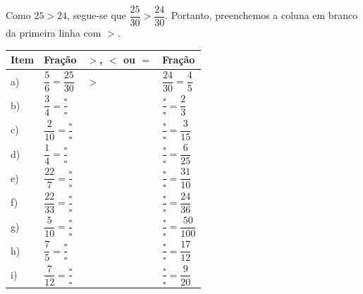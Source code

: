 \documentclass[10 pt,usenames,dvipsnames, oneside]{article}
\begin{document}
Como $25 > 24$, segue-se que $\dfrac{25}{30} > \dfrac{24}{30}$. Portanto, preenchemos a coluna em branco da primeira linha com $>$.


\begin{center}
\begin{longtable}{|	m{}|m{}|m{}|m{}|}
\hline
Item &  Fração &  $>$, $<$ ou $=$ &  Fração \\
\hline \hline
a) & \parbox[b][1.2cm][c]{3cm}{ $\dfrac{5}{6} = \dfrac{25}{30}$ } &   $>$&  $\dfrac{24}{30} = \dfrac{4}{5}$ \\
\hline
b) & \parbox[b][1.2cm][c]{3cm}{ $\dfrac{3}{4} = \dfrac{\square}{\square}$} &   &  $\dfrac{\square}{\square} = \dfrac{2}{3}$ \\
\hline
c) &  \parbox[b][1.2cm][c]{3cm}{$\dfrac{2}{10} = \dfrac{\square}{\square}$} &   &  $\dfrac{\square}{\square} = \dfrac{3}{15}$ \\
\hline
d) & \parbox[b][1.2cm][c]{3cm}{ $\dfrac{1}{4} = \dfrac{\square}{\square}$} &   &  $\dfrac{\square}{\square} = \dfrac{6}{25}$ \\
\hline
e) & \parbox[b][1.2cm][c]{3cm}{ $\dfrac{22}{7} = \dfrac{\square}{\square}$} &  &  $\dfrac{\square}{\square} = \dfrac{31}{10}$ \\
\hline
f) & \parbox[b][1.2cm][c]{3cm}{ $\dfrac{22}{33} = \dfrac{\square}{\square}$} &   &  $\dfrac{\square}{\square} = \dfrac{24}{36}$ \\
\hline
g) & \parbox[b][1.2cm][c]{3cm}{ $\dfrac{5}{10} = \dfrac{\square}{\square}$} &   &  $\dfrac{\square}{\square} = \dfrac{50}{100}$ \\
\hline
h) & \parbox[b][1.2cm][c]{3cm}{ $\dfrac{7}{5} = \dfrac{\square}{\square}$} &  &  $\dfrac{\square}{\square} = \dfrac{17}{12}$ \\
\hline
i) & \parbox[b][1.2cm][c]{3cm}{ $\dfrac{7}{12} = \dfrac{\square}{\square}$} &  &  $\dfrac{\square}{\square} = \dfrac{9}{20}$ \\
\hline
\end{longtable}
\end{center}
\end{document}
